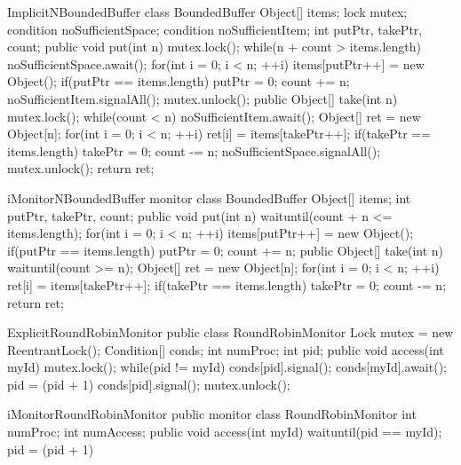 \documentclass[preprint]{sigplanconf}
\begin{document}
\begin{SaveVerbatim}{ImplicitNBoundedBuffer}
class BoundedBuffer {
  Object[] items;  
  lock mutex;
  condition noSufficientSpace;
  condition noSufficientItem;
  int putPtr, takePtr, count;
  public void put(int n) {
    mutex.lock();
    while(n + count > items.length) {
      noSufficientSpace.await();
    }
    for(int i = 0; i < n; ++i) {
      items[putPtr++] = new Object();
      if(putPtr == items.length) {
        putPtr = 0;
      }
    }
    count += n;
    noSufficientItem.signalAll();
    mutex.unlock();
  }
  public Object[] take(int n) {
    mutex.lock();
    while(count < n) {
      noSufficientItem.await();
    }
    Object[] ret = new Object[n];
    for(int i = 0; i < n; ++i) {
      ret[i] = items[takePtr++];
      if(takePtr == items.length) {
        takePtr = 0;
      }
    }
    count -= n;
    noSufficientSpace.signalAll();
    mutex.unlock();
    return ret;
  }
}
\end{SaveVerbatim}

\begin{SaveVerbatim}{iMonitorNBoundedBuffer}
monitor class BoundedBuffer { 
  Object[] items; 
  int putPtr, takePtr, count; 
  public void put(int n) { 
    waituntil(count + n <= items.length); 
    for(int i = 0; i < n; ++i) {
      items[putPtr++] = new Object(); 
      if(putPtr == items.length) { 
        putPtr = 0; 
      } 
    }
    count += n; 
  } 
  public Object[] take(int n) { 
    waituntil(count >= n);
    Object[] ret = new Object[n];
    for(int i = 0; i < n; ++i) {
      ret[i] = items[takePtr++]; 
      if(takePtr == items.length) { 
        takePtr = 0; 
      }
    }
    count -= n;
    return ret;
  }
}
\end{SaveVerbatim}
\begin{SaveVerbatim}{ExplicitRoundRobinMonitor}
public class RoundRobinMonitor{
  Lock mutex = new ReentrantLock();
  Condition[] conds;
  int numProc;
  int pid;
  public void access(int myId) {
    mutex.lock();
    while(pid != myId) {
      conds[pid].signal();
      conds[myId].await();
    }
    pid = (pid + 1) %
    conds[pid].signal();
    mutex.unlock();
  }
}
\end{SaveVerbatim}

\begin{SaveVerbatim}{iMonitorRoundRobinMonitor}
public monitor class RoundRobinMonitor {
  int numProc;
  int numAccess;
  public void access(int myId) {
    waituntil(pid == myId);
    pid = (pid + 1) %
  }
}
\end{SaveVerbatim}
\end{document}
